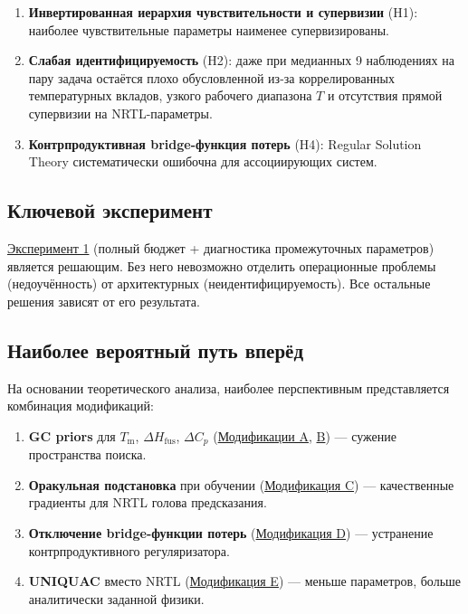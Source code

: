 \documentclass[11pt]{article}
\begin{document}
\begin{enumerate}
  \item \textbf{Инвертированная иерархия чувствительности и супервизии} (H1): наиболее чувствительные параметры наименее супервизированы.
  \item \textbf{Слабая идентифицируемость} (H2): даже при медианных 9 наблюдениях на пару задача остаётся плохо обусловленной из-за коррелированных температурных вкладов, узкого рабочего диапазона $T$ и отсутствия прямой супервизии на NRTL-параметры.
  \item \textbf{Контрпродуктивная bridge-функция потерь} (H4): Regular Solution Theory систематически ошибочна для ассоциирующих систем.
\end{enumerate}

\subsection{Ключевой эксперимент}

\hyperref[subsec:exp-full-budget]{Эксперимент 1} (полный бюджет + диагностика промежуточных параметров) является решающим. Без него невозможно отделить операционные проблемы (недоучённость) от архитектурных (неидентифицируемость). Все остальные решения зависят от его результата.

\subsection{Наиболее вероятный путь вперёд}

На основании теоретического анализа, наиболее перспективным представляется комбинация модификаций:

\begin{enumerate}
  \item \textbf{GC priors} для $T_{\mathrm{m}}$, $\Delta H_{\mathrm{fus}}$, $\Delta C_p$ (\hyperref[subsec:mod-a]{Модификации A}, \hyperref[subsec:mod-b]{B}) --- сужение пространства поиска.
  \item \textbf{Оракульная подстановка} при обучении (\hyperref[subsec:mod-c]{Модификация C}) --- качественные градиенты для NRTL голова предсказания.
  \item \textbf{Отключение bridge-функции потерь} (\hyperref[subsec:mod-d]{Модификация D}) --- устранение контрпродуктивного регуляризатора.
  \item \textbf{UNIQUAC} вместо NRTL (\hyperref[subsec:mod-e]{Модификация E}) --- меньше параметров, больше аналитически заданной физики.
\end{enumerate}
\end{document}
